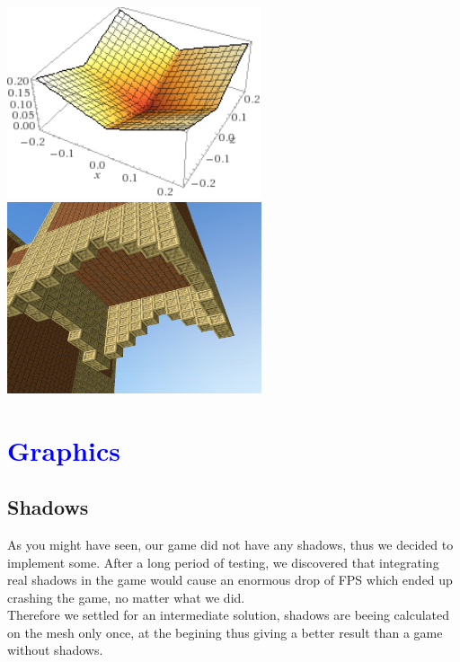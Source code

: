 \documentclass[article]{report}             %
\begin{document}
				\begin{center}
					\includegraphics[width=7.5cm]{images/Abs.png}
					\includegraphics[width=7.5cm]{images/DT/DarkBeard.png} %
				\end{center}

		\chapter{\textcolor{blue}{Graphics}}
			\section{Shadows}
				As you might have seen, our game did not have any shadows, thus we decided to implement some. After a long period of testing, we discovered that integrating real shadows in the game would cause an enormous drop of FPS which ended up crashing the game, no matter what we did.\\

				Therefore we settled for an intermediate solution, shadows are beeing calculated on the mesh only once, at the begining thus giving a better result than a game without shadows.
\end{document}
